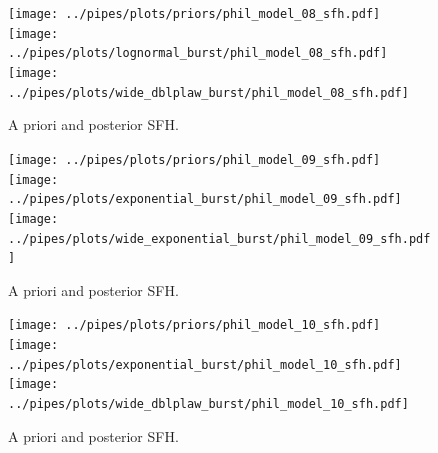 \documentclass[a4paper,11pt]{article}
\begin{document}
\newpage
\begin{figure}[h!]
  \centering
  \texttt{[image: ../pipes/plots/priors/phil\_model\_08\_sfh.pdf]}
  \texttt{[image: ../pipes/plots/lognormal\_burst/phil\_model\_08\_sfh.pdf]}
  \texttt{[image: ../pipes/plots/wide\_dblplaw\_burst/phil\_model\_08\_sfh.pdf]}
  \caption{A priori and posterior SFH.}
  \label{}
\end{figure}

\newpage
\begin{figure}[h!]
  \centering
  \texttt{[image: ../pipes/plots/priors/phil\_model\_09\_sfh.pdf]}
  \texttt{[image: ../pipes/plots/exponential\_burst/phil\_model\_09\_sfh.pdf]}
  \texttt{[image: ../pipes/plots/wide\_exponential\_burst/phil\_model\_09\_sfh.pdf]}
  \caption{A priori and posterior SFH.}
  \label{}
\end{figure}

\newpage
\begin{figure}[h!]
  \centering
  \texttt{[image: ../pipes/plots/priors/phil\_model\_10\_sfh.pdf]}
  \texttt{[image: ../pipes/plots/exponential\_burst/phil\_model\_10\_sfh.pdf]}
  \texttt{[image: ../pipes/plots/wide\_dblplaw\_burst/phil\_model\_10\_sfh.pdf]}
  \caption{A priori and posterior SFH.}
  \label{}
\end{figure}
\end{document}
